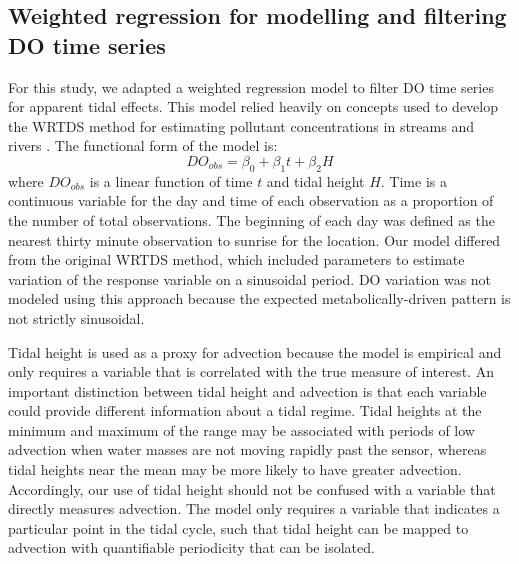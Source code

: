 \documentclass[letterpaper,12pt,oneside]{article}\usepackage[]{graphicx}\usepackage[]{color}
\begin{document}
\subsection{Weighted regression for modelling and filtering \ac{DO} time series}

For this study, we adapted a weighted regression model to filter \ac{DO} time series for apparent tidal effects.  This model relied heavily on concepts used to develop the \ac{WRTDS} method for estimating pollutant concentrations in streams and rivers \citep{Hirsch10}.  The functional form of the model is:
\begin{equation}\label{funform}
DO_{obs}= \beta_0 + \beta_1 t + \beta_2 H
\end{equation}
where $DO_{obs}$ is a linear function of time $t$ and tidal height $H$.  Time is a continuous variable for the day and time of each observation as a proportion of the number of total observations.  The beginning of each day was defined as the nearest thirty minute observation to sunrise for the location.  Our model differed from the original \ac{WRTDS} method, which included parameters to estimate variation of the response variable on a sinusoidal period.  \ac{DO} variation was not modeled using this approach because the expected metabolically-driven pattern is not strictly sinusoidal.  

Tidal height is used as a proxy for advection because the model is empirical and only requires a variable that is correlated with the true measure of interest.  An important distinction between tidal height and advection is that each variable could provide different information about a tidal regime.  Tidal heights at the minimum and maximum of the range may be associated with periods of low advection when water masses are not moving rapidly past the sensor, whereas tidal heights near the mean may be more likely to have greater advection.  Accordingly, our use of tidal height should not be confused with a variable that directly measures advection.  The model only requires a variable that indicates a particular point in the tidal cycle, such that tidal height can be mapped to advection with quantifiable periodicity that can be isolated. 
\end{document}
